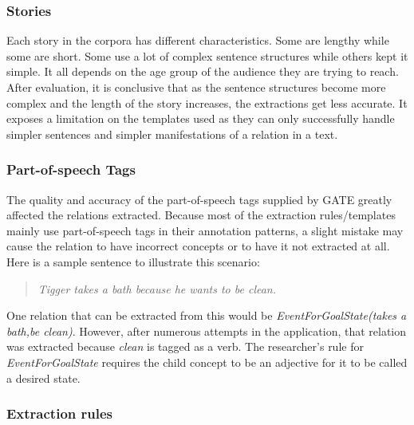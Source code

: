 \subsubsection{Stories}
\label{sec:stories}

Each story in the corpora has different characteristics. Some are lengthy while some are short. Some use a lot of complex sentence structures while others kept it simple. It all depends on the age group of the audience they are trying to reach. After evaluation, it is conclusive that as the sentence structures become more complex and the length of the story increases, the extractions get less accurate. It exposes a limitation on the templates used as they can only successfully handle simpler sentences and simpler manifestations of a relation in a text.

\subsubsection{Part-of-speech Tags}
\label{sec:pos}

The quality and accuracy of the part-of-speech tags supplied by GATE greatly affected the relations extracted. Because most of the extraction rules/templates mainly use part-of-speech tags in their annotation patterns, a slight mistake may cause the relation to have incorrect concepts or to have it not extracted at all. Here is a sample sentence to illustrate this scenario:

\begin{verse}
\itshape
Tigger takes a bath because he wants to be clean.
\end{verse}

One relation that can be extracted from this would be \textit{EventForGoalState(takes a bath,be clean)}. However, after numerous attempts in the application, that relation was extracted because \textit{clean} is tagged as a verb. The researcher's rule for \textit{EventForGoalState} requires the child concept to be an adjective for it to be called a desired state.

\subsubsection{Extraction rules}
\label{sec:templates}

